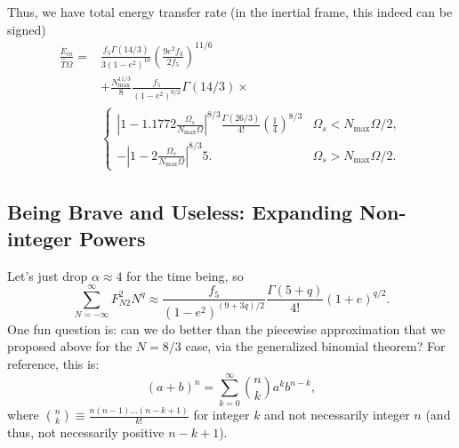 \documentclass[11pt,
        usenames, %
        dvipsnames %
    ]{article}
\newcommand*{\abs}[1]{\left|#1\right|}
\newcommand*{\p}[1]{\left(#1\right)}
\begin{document}
Thus, we have total energy transfer rate (in the inertial frame, this indeed can
be signed)
\begin{align}
    \frac{\dot{E}_{in}}{\hat{T}\Omega} ={}&
            \frac{f_5 \Gamma(14/3)}{3\p{1 - e^2}^{10}}
                \p{\frac{9e^2f_3}{2f_5}}^{11/6}\nonumber\\
        &+
            \frac{N_{\max}^{11/3}}{8}
            \frac{f_5}{\p{1 - e^2}^{9/2}}
            \Gamma\p{14/3} \times\nonumber\\
        &\begin{cases}
            \abs{1 - 1.1772\frac{\Omega_s}{N_{\max}\Omega}}^{8/3}
                \frac{\Gamma\p{26/3}}{4!}\p{\frac{1}{4}}^{8/3}
                & \Omega_s < N_{\max}\Omega/2,\\[5pt]
            -\abs{1 - 2\frac{\Omega_s}{N_{\max}\Omega}}^{8/3}5.
                & \Omega_s > N_{\max}\Omega/2.
        \end{cases}\label{eq:total_heating}
\end{align}

\subsection{Being Brave and Useless: Expanding Non-integer Powers}

Let's just drop $\alpha \approx 4$ for the time being, so
\begin{equation}
    \sum\limits_{N = -\infty}^\infty F_{N2}^2 N^q
        \approx \frac{f_5}{\p{1 - e^2}^{(9 + 3q) / 2}}
            \frac{\Gamma\p{5 + q}}{4!} \p{1 + e}^{q/2}.
\end{equation}
One fun question is: can we do better than the piecewise approximation that we
proposed above for the $N = 8/3$ case, via the generalized binomial theorem? For
reference, this is:
\begin{equation}
    \p{a + b}^n = \sum\limits_{k = 0}^\infty \binom{n}{k}a^kb^{n - k},
\end{equation}
where $\binom{n}{k} \equiv \frac{n(n - 1)\dots (n - k + 1)}{k!}$ for integer $k$
and not necessarily integer $n$ (and thus, not necessarily positive $n - k +
1$).
\end{document}
